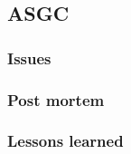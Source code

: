 

\subsection{ASGC}
\label{sec:site:asgc}

\subsubsection{Issues}
\label{sec:site:asgc:Issues}

\subsubsection{Post mortem}
\label{sec:site:asgc:postmortem}

\subsubsection{Lessons learned}
\label{sec:site:asgc:lessons}
